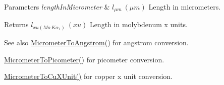 \begin{DoxyParams}{Parameters}
{\em length\+In\+Micrometer} & $ l_{\mu m}\ (\mu m)$ Length in micrometers. \\
\hline
\end{DoxyParams}
\begin{DoxyReturn}{Returns}
$ l_{xu(Mo\ K\alpha_1)}\ (xu)$ Length in molybdenum x units. 
\end{DoxyReturn}
\begin{DoxySeeAlso}{See also}
\mbox{\hyperlink{group___e_g_x_math-_conversions-_length_conversions-_micrometer-_non-_s_i_ga4b7df35169682046455e9a6f99447777}{Micrometer\+To\+Angstrom()}} for angstrom conversion. 

\mbox{\hyperlink{group___e_g_x_math-_conversions-_length_conversions-_micrometer-_s_i_ga912ed4989391eeb5d25f43e99108502e}{Micrometer\+To\+Picometer()}} for picometer conversion. 

\mbox{\hyperlink{group___e_g_x_math-_conversions-_length_conversions-_micrometer-_non-_s_i_ga9ec609bbfdde5144c9f40d9093a5b8a7}{Micrometer\+To\+Cu\+X\+Unit()}} for copper x unit conversion. 
\end{DoxySeeAlso}
